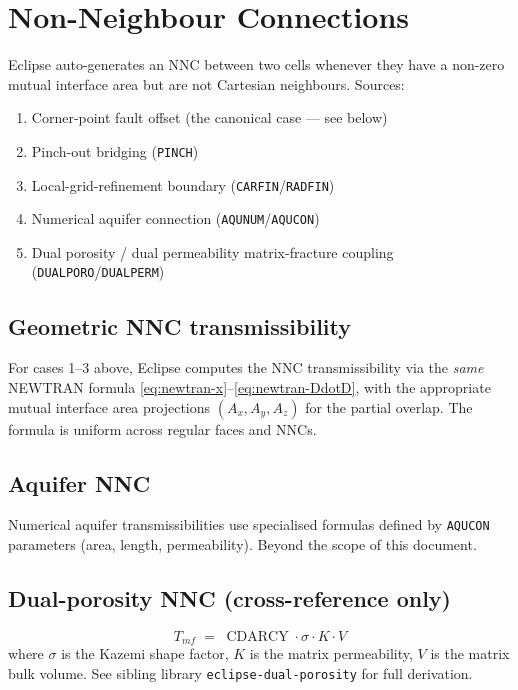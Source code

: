 \documentclass[11pt,a4paper]{article}
\newcommand{\kw}[1]{\texttt{#1}}
\DeclareMathOperator{\CDARCY}{CDARCY}
\begin{document}
\section{Non-Neighbour Connections}

Eclipse auto-generates an NNC between two cells whenever they have a non-zero mutual interface area
but are not Cartesian neighbours. Sources:

\begin{enumerate}
  \item Corner-point fault offset (the canonical case — see below)
  \item Pinch-out bridging (\kw{PINCH})
  \item Local-grid-refinement boundary (\kw{CARFIN}/\kw{RADFIN})
  \item Numerical aquifer connection (\kw{AQUNUM}/\kw{AQUCON})
  \item Dual porosity / dual permeability matrix-fracture coupling (\kw{DUALPORO}/\kw{DUALPERM})
\end{enumerate}

\subsection*{Geometric NNC transmissibility}
For cases 1--3 above, Eclipse computes the NNC transmissibility via the \emph{same} NEWTRAN formula
\eqref{eq:newtran-x}--\eqref{eq:newtran-DdotD}, with the appropriate mutual interface area projections
$(A_x, A_y, A_z)$ for the partial overlap. The formula is uniform across regular faces and NNCs.

\subsection*{Aquifer NNC}
Numerical aquifer transmissibilities use specialised formulas defined by \kw{AQUCON} parameters
(area, length, permeability). Beyond the scope of this document.

\subsection*{Dual-porosity NNC (cross-reference only)}
\begin{equation}
T_{mf} \;=\; \CDARCY \cdot \sigma \cdot K \cdot V
\label{eq:dp-nnc}
\tag{TD 2.54}
\end{equation}
where $\sigma$ is the Kazemi shape factor, $K$ is the matrix permeability, $V$ is the matrix
bulk volume. See sibling library \texttt{eclipse-dual-porosity} for full derivation.
\end{document}
